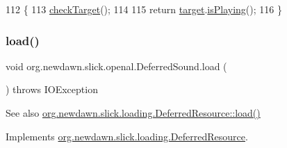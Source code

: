 \begin{DoxyCode}
112                                \{
113         \mbox{\hyperlink{classorg_1_1newdawn_1_1slick_1_1openal_1_1_deferred_sound_a63fc1a65a177fcaeb93ba0a071c10086}{checkTarget}}();
114         
115         \textcolor{keywordflow}{return} \mbox{\hyperlink{classorg_1_1newdawn_1_1slick_1_1openal_1_1_deferred_sound_ab156655c2d91c0a6bbec8bd4438ac875}{target}}.\mbox{\hyperlink{interfaceorg_1_1newdawn_1_1slick_1_1openal_1_1_audio_a842b49128a58be8c4473cbcc8ee4ad9e}{isPlaying}}();
116     \}
\end{DoxyCode}
\mbox{\label{classorg_1_1newdawn_1_1slick_1_1openal_1_1_deferred_sound_a4f7e7f24c22aa787cc38ef670c4e4dc8}} 
\subsubsection{\texorpdfstring{load()}{load()}}
{\footnotesize\ttfamily void org.\+newdawn.\+slick.\+openal.\+Deferred\+Sound.\+load (\begin{DoxyParamCaption}{ }\end{DoxyParamCaption}) throws I\+O\+Exception\hspace{0.3cm}{\ttfamily [inline]}}

\begin{DoxySeeAlso}{See also}
\mbox{\hyperlink{interfaceorg_1_1newdawn_1_1slick_1_1loading_1_1_deferred_resource_a08c6171e3a44634c06c9160f5b785ad6}{org.\+newdawn.\+slick.\+loading.\+Deferred\+Resource\+::load()}} 
\end{DoxySeeAlso}


Implements \mbox{\hyperlink{interfaceorg_1_1newdawn_1_1slick_1_1loading_1_1_deferred_resource_a08c6171e3a44634c06c9160f5b785ad6}{org.\+newdawn.\+slick.\+loading.\+Deferred\+Resource}}.


